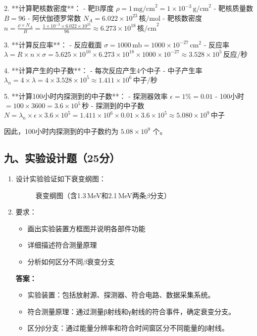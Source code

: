 \documentclass{article}
\begin{document}
2. **计算靶核数密度**：
   - 靶B厚度 \( \rho = 1 \, \text{mg/cm}^2 = 1 \times 10^{-3} \, \text{g/cm}^2 \)
   - 靶核质量数 \( B = 96 \)
   - 阿伏伽德罗常数 \( N_A = 6.022 \times 10^{23} \, \text{核/mol} \)
   - 靶核数密度 \( n = \frac{\rho \times N_A}{B} = \frac{1 \times 10^{-3} \times 6.022 \times 10^{23}}{96} \approx 6.273 \times 10^{18} \, \text{核/cm}^2 \)

3. **计算反应率**：
   - 反应截面 \( \sigma = 1000 \, \text{mb} = 1000 \times 10^{-27} \, \text{cm}^2 \)
   - 反应率 \( \lambda = R \times n \times \sigma = 5.625 \times 10^{10} \times 6.273 \times 10^{18} \times 1000 \times 10^{-27} \approx 3.528 \times 10^{5} \, \text{反应/秒} \)

4. **计算产生的中子数**：
   - 每次反应产生4个中子
   - 中子产生率 \( \lambda_n = 4 \times \lambda = 4 \times 3.528 \times 10^{5} \approx 1.411 \times 10^{6} \, \text{中子/秒} \)

5. **计算100小时内探测到的中子数**：
   - 探测器效率 \( \epsilon = 1\% = 0.01 \)
   - 100小时 \( = 100 \times 3600 = 3.6 \times 10^{5} \, \text{秒} \)
   - 探测到的中子数 \( N = \lambda_n \times \epsilon \times 3.6 \times 10^{5} = 1.411 \times 10^{6} \times 0.01 \times 3.6 \times 10^{5} \approx 5.080 \times 10^{9} \, \text{中子} \)

因此，100小时内探测到的中子数约为 \( 5.08 \times 10^{9} \) 个。

\subsection*{九、实验设计题（25分）}
\begin{enumerate}
  \item 设计实验验证如下衰变纲图：
  \begin{figure}[h]
    \centering
    \caption{衰变纲图（含1.3\,MeV和2.1\,MeV两条$\beta$分支）}
  \end{figure}
  
  \item 要求：
  \begin{itemize}
    \item 画出实验装置方框图并说明各部件功能
    \item 详细描述符合测量原理
    \item 分析如何区分不同$\beta$衰变分支
  \end{itemize}
  
  \textbf{答案：}
  \begin{itemize}
    \item 实验装置：包括放射源、探测器、符合电路、数据采集系统。
    \item 符合测量原理：通过测量β射线和γ射线的符合事件，确定衰变分支。
    \item 区分β分支：通过能量分辨率和符合时间窗区分不同能量的β射线。
  \end{itemize}
\end{enumerate}
\end{document}
